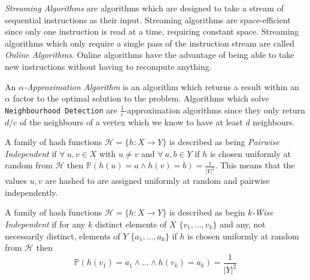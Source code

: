 \documentclass[11pt,twoside,a4paper]{report}
\begin{document}
\par \textit{Streaming Algorithms} are algorithms which are designed to take a stream of sequential instructions as their input. Streaming algorithms are space-efficient since only one instruction is read at a time, requiring constant space. Streaming algorithms which only require a single pass of the instruction stream are called \textit{Online Algorithms}. Online algorithms have the advantage of being able to take new instructions without having to recompute anything.

\par An \textit{$\alpha$-Approximation Algorithm} is an algorithm which returns a result within an $\alpha$ factor to the optimal solution to the problem. Algorithms which solve \texttt{Neighbourhood Detection} are $\frac1c$-approximation algorithms since they only return $d/c$ of the neighbours of a vertex which we know to have at least $d$ neighbours.

\par A family of hash functions $\mathcal{H}=\{h:X\to Y\}$ is described as being \textit{Pairwise Independent} if $\forall\ u,v\in X$ with $u\neq v$ and $\forall\ a,b\in Y$ if $h$ is chosen uniformly at random from $\mathcal{H}$ then $\mathbb{P}(h(u)=a\wedge h(v)=b)=\frac1{|Y|^2}$. This means that the values $u,v$ are hashed to are assigned uniformly at random and pairwise independently.

\par A family of hash functions $\mathcal{H}=\{h:X\to Y\}$ is described as begin \textit{$k$-Wise Independent} if for any $k$ distinct elements of $X$ $\{v_1,\dots,v_k\}$ and any, not necessarily distinct, elements of $Y$ $\{a_1,\dots,a_k\}$ if $h$ is chosen uniformly at random from $\mathcal{H}$ then $$\mathbb{P}(h(v_1)=a_1\wedge\dots\wedge h(v_k)=a_k)=\frac1{|Y|^2}$$
\end{document}
